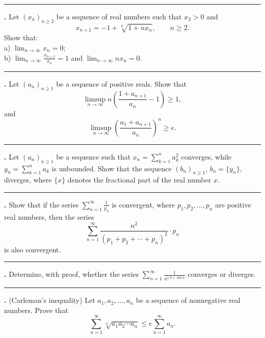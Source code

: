 \documentclass[11pt]{article}
\newcounter{probnum}
\newenvironment{problembox}{\par\noindent\rule{\linewidth}{0.5pt}\vspace{5pt}\par}{\vspace{2pt}}
\begin{document}
\begin{problembox}
\textbf{\theprobnum.} Let $(x_n)_{n \ge 2}$ be a sequence of real numbers such that $x_2 > 0$ and
\[
x_{n+1} = -1 + \sqrt[n]{1+n x_n}, \qquad n \ge 2.
\]
Show that:\\
a) $\displaystyle\lim_{n \to \infty} x_n = 0$;\\
b) $\displaystyle\lim_{n \to \infty} \frac{x_{n+1}}{x_n} = 1$ and $\displaystyle\lim_{n \to \infty} n x_n = 0$.
\end{problembox}

\begin{problembox}
\textbf{\theprobnum.} Let $(a_n)_{n \ge 1}$ be a sequence of positive reals. Show that
\[
\limsup_{n \to \infty} n\left(\frac{1+a_{n+1}}{a_n} - 1\right) \ge 1,
\]
and
\[
\limsup_{n \to \infty} \left(\frac{a_1 + a_{n+1}}{a_n}\right)^n \ge e.
\]
\end{problembox}

\begin{problembox}
\textbf{\theprobnum.} Let $(a_n)_{n \ge 1}$ be a sequence such that $x_n = \displaystyle\sum_{k=1}^{n} a_k^2$ converges, while $y_n = \displaystyle\sum_{k=1}^{n} a_k$ is unbounded. Show that the sequence $(b_n)_{n \ge 1}$, $b_n = \{y_n\}$, diverges, where $\{x\}$ denotes the fractional part of the real number $x$.
\end{problembox}

\begin{problembox}
\textbf{\theprobnum.} Show that if the series $\displaystyle\sum_{n=1}^{\infty} \frac{1}{p_n}$ is convergent, where $p_1, p_2, \ldots, p_n$ are positive real numbers, then the series
\[
\sum_{n=1}^{\infty} \frac{n^2}{(p_1+p_2+\cdots+p_n)^2} \cdot p_n
\]
is also convergent.
\end{problembox}

\begin{problembox}
\textbf{\theprobnum.} Determine, with proof, whether the series $\displaystyle\sum_{n=1}^{\infty} \frac{1}{n^{1.8+\sin n}}$ converges or diverges.
\end{problembox}

\begin{problembox}
\textbf{\theprobnum.} (Carleman's inequality) Let $a_1, a_2, \ldots, a_n$ be a sequence of nonnegative real numbers. Prove that
\[
\sum_{n=1}^{\infty} \sqrt[n]{a_1 a_2 \cdots a_n} \le e \sum_{n=1}^{\infty} a_n.
\]
\end{problembox}
\end{document}
